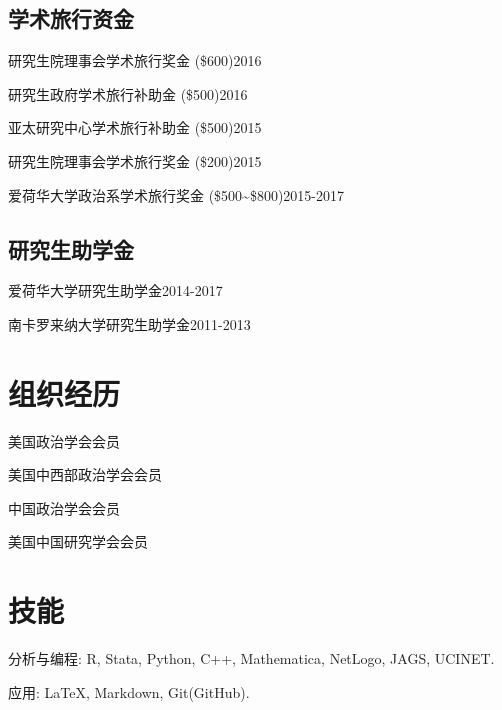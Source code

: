\documentclass[10.5pt,]{article}
\providecommand{\tightlist}{%
  \setlength{\itemsep}{0pt}\setlength{\parskip}{0pt}}
\renewenvironment{itemize}{
  \begin{list}{}{
    \setlength{\leftmargin}{1.5em}
  }
}{
  \end{list}
}
\begin{document}
\subsection{学术旅行资金}

\begin{itemize}
\tightlist
\item
  研究生院理事会学术旅行奖金 (\$600)\hfill 2016
\item
  研究生政府学术旅行补助金 (\$500)\hfill 2016
\item
  亚太研究中心学术旅行补助金 (\$500)\hfill 2015
\item
  研究生院理事会学术旅行奖金 (\$200)\hfill 2015
\item
  爱荷华大学政治系学术旅行奖金
  (\$500\textasciitilde{}\$800)\hfill 2015-2017
\end{itemize}

\subsection{研究生助学金}

\begin{itemize}
\tightlist
\item
  爱荷华大学研究生助学金\hfill 2014-2017
\item
  南卡罗来纳大学研究生助学金\hfill 2011-2013
\end{itemize}

\section{组织经历}

\begin{itemize}
\tightlist
\item
  美国政治学会会员
\item
  美国中西部政治学会会员
\item
  中国政治学会会员
\item
  美国中国研究学会会员
\end{itemize}

\section{技能}

\begin{itemize}
\tightlist
\item
  分析与编程: R, Stata, Python, C++, Mathematica, NetLogo, JAGS, UCINET.
\item
  应用: \LaTeX, Markdown, Git(GitHub).
\end{itemize}
\end{document}
